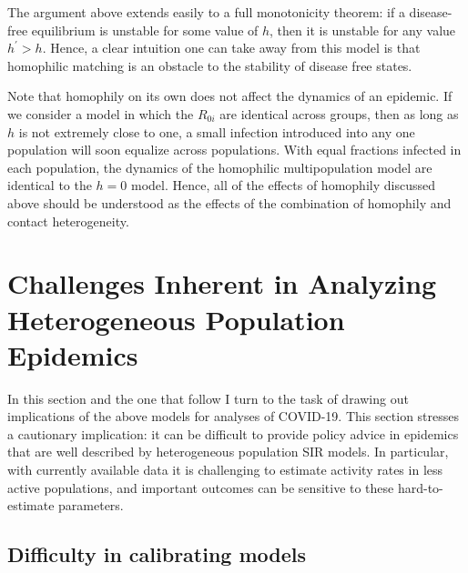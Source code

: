 \documentclass[11pt]{article}
\begin{document}
The argument above extends easily to a full monotonicity theorem: if a
disease-free equilibrium is unstable for some value
of $h$, then it is unstable for any value $h^{\prime} > h$. Hence, a clear intuition one can
take away from this model is that homophilic matching is an obstacle to the stability of disease
free states.

Note that homophily on its own does not affect the dynamics of an epidemic. If we consider a model in which the $R_{0i}$ are identical across groups, then as long as $h$ is not extremely close to one, a small infection introduced into any one population will soon equalize across populations. With equal fractions infected in each population, the dynamics of the homophilic multipopulation model are identical to the $h=0$ model. Hence, all of the effects of homophily discussed above should be understood as the effects of the combination of homophily and contact heterogeneity.

\section{Challenges Inherent in Analyzing Heterogeneous Population Epidemics}

In this section and the one that follow I turn to the task of drawing out implications of the above models for analyses of COVID-19.
This section stresses a cautionary implication: 
it can be difficult
to provide policy advice in epidemics that are
well described by heterogeneous population SIR models. In particular, with currently available data it is challenging to estimate activity rates in less active populations, and important outcomes can be sensitive to these hard-to-estimate parameters.

\subsection{Difficulty in calibrating models}
\end{document}
